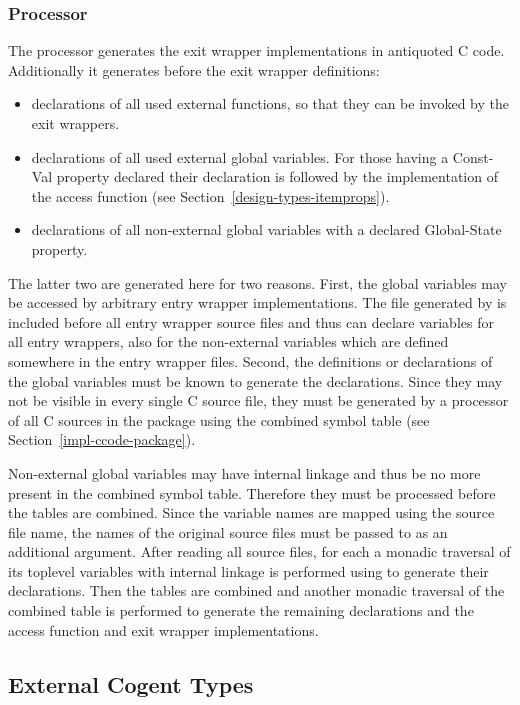 \subsubsection{Processor }

The processor  generates the exit wrapper implementations in antiquoted C code.
Additionally it generates before the exit wrapper definitions:
\begin{itemize}
\item declarations of all used external functions, so that they can be invoked by the exit wrappers.
\item declarations of all used external global variables. For those having a Const-Val property declared their
declaration is followed by the implementation of the access function (see Section~\ref{design-types-itemprops}).
\item declarations of all non-external global variables with a declared Global-State property.
\end{itemize}
The latter two are generated here for two reasons. First, the global variables may be accessed by arbitrary entry
wrapper implementations. The file generated by  is included before all entry wrapper 
source files and thus can declare variables for all entry wrappers, also for the non-external variables which
are defined somewhere in the entry wrapper files. Second, the definitions or declarations of the global variables 
must be known to generate the declarations. Since they may not be visible in every single C source file, they 
must be generated by a processor of all C sources in the package using the combined symbol table (see 
Section~\ref{impl-ccode-package}).

Non-external global variables may have internal linkage and thus be no more present in the combined symbol table.
Therefore they must be processed before the tables are combined. Since
the variable names are mapped using the source file name, the names of the original source files must be passed
to  as an additional argument. After reading all source files, for each a monadic traversal
of its toplevel variables with internal linkage is performed using  to generate their declarations.
Then the tables are combined and another monadic traversal of the combined table is performed to generate the 
remaining declarations and the access function and exit wrapper implementations.

\subsection{External Cogent Types}
\label{impl-ccomps-exttypes}


